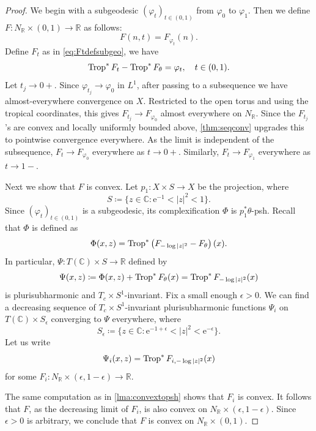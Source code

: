 \begin{proof}
We begin with a subgeodesic $(\varphi_t)_{t\in (0,1)}$ from $\varphi_0$ to $\varphi_1$. Then we define $F\colon N_{\mathbb{R}}\times (0,1)\rightarrow \mathbb{R}$ as follows:
    \[
    F(n,t)=F_{\varphi_t}(n).
    \]
    Define $F_t$ as in \eqref{eq:Ftdefsubgeo}, we have
    \[
    \operatorname{Trop}^* F_t-\operatorname{Trop}^* F_{\theta}=\varphi_t,\quad t\in (0,1).
    \]
    Let $t_j\to 0+$. Since $\varphi_{t_j}\to\varphi_0$ in $L^1$, after passing to a subsequence we have almost-everywhere convergence on $X$. Restricted to the open torus and using the tropical coordinates, this gives $F_{t_j}\to F_{\varphi_0}$ almost everywhere on $N_{\mathbb R}$. Since the $F_{t_j}$'s are convex and locally uniformly bounded above, \cref{thm:seqconv} upgrades this to pointwise convergence everywhere. As the limit is independent of the subsequence, $F_t\to F_{\varphi_0}$ everywhere as $t\to0+$. Similarly, $F_t\to F_{\varphi_1}$ everywhere as $t\to 1-$.

    Next we show that $F$ is convex. Let $p_1\colon X\times S\rightarrow X$ be the projection, where
    \[
    S\coloneqq \{z\in \mathbb{C}:  \mathrm{e}^{-1}<|z|^2<1\}.
    \]
    Since $(\varphi_t)_{t\in(0,1)}$ is a subgeodesic, its complexification $\Phi$ is $p_1^*\theta$-psh. Recall that $\Phi$ is defined as
    \begin{equation}\label{eq:Phixz}
    \Phi(x,z)=\operatorname{Trop}^*\left( F_{-\log |z|^2}-F_{\theta} \right)(x).
    \end{equation}
    In particular, $\Psi\colon T(\mathbb{C})\times S\rightarrow \mathbb{R}$ defined by
    \[
    \Psi(x,z)\coloneqq \Phi(x,z)+\operatorname{Trop}^*F_{\theta}(x)=\operatorname{Trop}^*F_{-\log |z|^2}(x)
    \]
    is plurisubharmonic and $T_c\times S^1$-invariant.
    Fix a small enough $\epsilon>0$. We can find a decreasing sequence of $T_c\times S^1$-invariant plurisubharmonic functions $\Psi_i$ on $T(\mathbb{C})\times S_{\epsilon}$ converging to $\Psi$ everywhere, where
    \[
    S_{\epsilon}\coloneqq \{z\in \mathbb{C}: \mathrm{e}^{-1+\epsilon}<|z|^2<\mathrm{e}^{-\epsilon}\}.
    \]
    Let us write
    \[
    \Psi_i(x,z)=\operatorname{Trop}^*F_{i,-\log |z|^2}(x)
    \]
    for some $F_i\colon N_{\mathbb{R}}\times (\epsilon,1-\epsilon)\rightarrow \mathbb{R}$.

    The same computation as in \cref{lma:convextopsh} shows that $F_i$ is convex. It follows that $F$, as the decreasing limit of $F_i$, is also convex on $N_{\mathbb{R}}\times (\epsilon,1-\epsilon)$. Since $\epsilon>0$ is arbitrary, we conclude that $F$ is convex on $N_{\mathbb{R}}\times (0,1)$.


\end{proof}
